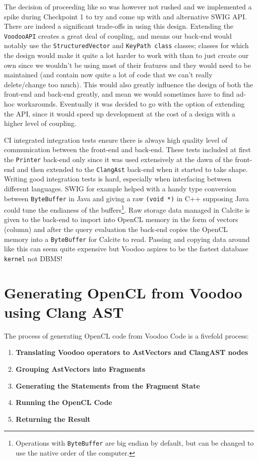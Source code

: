 The decision of proceeding like so was however not rushed and we implemented a spike during Checkpoint 1 to try and come up with and alternative SWIG API. There are indeed a significant trade-offs in using this design. Extending the \texttt{VoodooAPI} creates a great deal of coupling, and means our back-end would notably use the \texttt{StructuredVector} and \texttt{KeyPath class} classes; classes for which the design would make it quite a lot harder to work with than to just create our own since we wouldn't be using most of their features and they would need to be maintained (and contain now quite a lot of code that we can't really delete/change too much). This would also greatly influence the design of both the front-end and back-end greatly, and mean we would sometimes have to find ad-hoc workarounds. Eventually it was decided to go with the option of extending the API, since it would speed up development at the cost of a design with a higher level of coupling.

CI integrated integration tests ensure there is always high quality level of communication between the front-end and back-end. These tests included at first the \texttt{Printer} back-end only since it was used extensively at the dawn of the front-end and then extended to the \texttt{ClangAst} back-end when it started to take shape. Writing good integration tests is hard, especially when interfacing between different languages. SWIG for example helped with a handy type conversion between \texttt{ByteBuffer} in Java and giving a raw \texttt{(void *)} in C++ supposing Java could tune the endianess of the buffers\footnote{Operations with \texttt{ByteBuffer} are big endian by default, but can be changed to use the native order of the computer.}. Raw storage data managed in Calcite is given to the back-end to import into OpenCL memory in the form of vectors (column) and after the query evaluation the back-end copies the OpenCL memory into a \texttt{ByteBuffer} for Calcite to read. Passing and copying data around like this can seem quite expensive but Voodoo aspires to be the fastest database \texttt{kernel} not DBMS!

\section{Generating OpenCL from Voodoo using Clang AST}
\label{section:voodoo-to-opencl}

The process of generating OpenCL code from Voodoo Code is a fivefold process:
\begin{enumerate}
    \item \textbf{Translating Voodoo operators to AstVectors and ClangAST nodes}
    \item \textbf{Grouping AstVectors into Fragments}
    \item \textbf{Generating the Statements from the Fragment State}
    \item \textbf{Running the OpenCL Code}
    \item \textbf{Returning the Result}
\end{enumerate}


